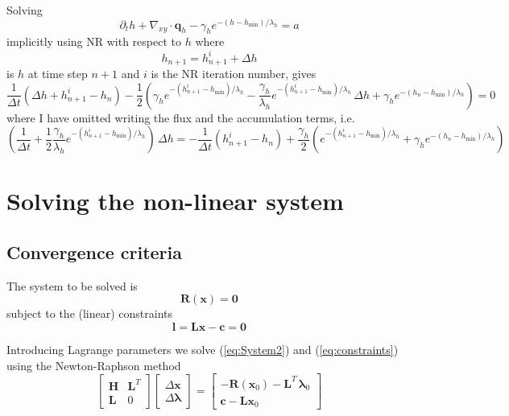 \documentclass[10pt,a4paper]{book}
\newcommand{\p}{\partial}
\begin{document}
Solving
\[
\p_t h + \nabla_{xy} \cdot \bm{q}_h  -\gamma_h e^{-(h-h_{\mathrm{min}})/\lambda_h} = a
\]
implicitly using NR with respect to $h$ where
\[
h_{n+1}=h_{n+1}^i+\Delta h
\]
is $h$ at time step $n+1$ and $i$ is the NR iteration number, gives
\[ 
\frac{1}{\Delta t} ( \Delta h + h^i_{n+1} - h_n)
-\frac{1}{2} \left (\gamma_h e^{-(h_{n+1}^i -h_{\mathrm{min}})/\lambda_h} 
-\frac{\gamma_h}{\lambda_h} e^{-(h_{n+1}^i -h_{\mathrm{min}})/\lambda_h}\,\Delta h 
+  \gamma_h e^{-(h_n-h_{\mathrm{min}})/\lambda_h} \right )=0
\]
where I have omitted writing the flux and the accumulation terms, i.e.\
\[
\left ( \frac{1}{\Delta t} + \frac{1}{2} \frac{\gamma_h}{\lambda_h} e^{-(h_{n+1}^i -h_{\mathrm{min}})/\lambda_h} \right ) \,\Delta h 
=-\frac{1}{\Delta t} (h^i_{n+1} - h_n)
+\frac{\gamma_h}{2} \left ( e^{-(h_{n+1}^i -h_{\mathrm{min}})/\lambda_h} 
+  \gamma_h e^{-(h_n-h_{\mathrm{min}})/\lambda_h} \right )
\]



\chapter{Solving the non-linear system}

\section{Convergence criteria}
The system to be solved is
\begin{equation}
 \bm{R}(\bm{x})= \bm{0}
\label{eq:System2}
\end{equation}
subject to the (linear) constraints
\begin{equation}
\bm{l}=\bm{L} \bm{x} -\bm{c} = \bm{0}
\label{eq:constraints}
\end{equation}

Introducing Lagrange parameters we solve (\ref{eq:System2}) and
(\ref{eq:constraints}) using the Newton-Raphson method
\begin{equation}
\left [ \begin{array}{cc}
\bm{H}    & \bm{L}^T  \\
 \bm{L} & 0 
\end{array} \right ]
\left [ \begin{array}{c}
\Delta \bm{x} \\
\Delta \bm{\lambda}
\end{array} \right ]
=\left [ \begin{array}{c}
-\bm{R}(\bm{x}_0) -  \bm{L}^T \, \bm{\lambda}_0 \\
\bm{c} -\bm{L} \bm{x}_0
\end{array} \right ]
\label{eq:KLL}
\end{equation}
\end{document}
